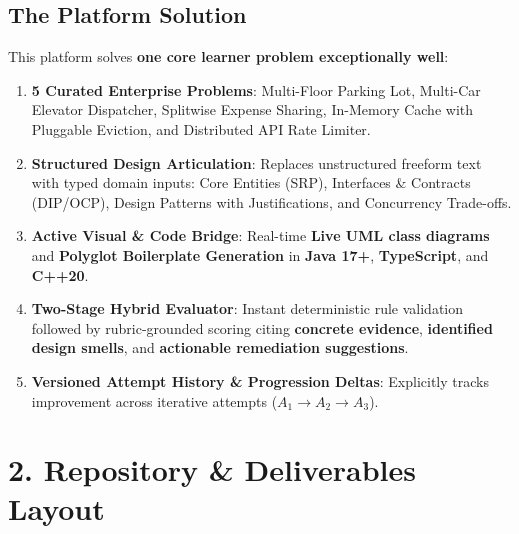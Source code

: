 \documentclass[10pt,a4paper]{article}
\begin{document}
\subsection{The Platform Solution}
This platform solves \textbf{one core learner problem exceptionally well}:
\begin{enumerate}
  \item \textbf{5 Curated Enterprise Problems}: Multi-Floor Parking Lot, Multi-Car Elevator Dispatcher, Splitwise Expense Sharing, In-Memory Cache with Pluggable Eviction, and Distributed API Rate Limiter.
  \item \textbf{Structured Design Articulation}: Replaces unstructured freeform text with typed domain inputs: Core Entities (SRP), Interfaces \& Contracts (DIP/OCP), Design Patterns with Justifications, and Concurrency Trade-offs.
  \item \textbf{Active Visual \& Code Bridge}: Real-time \textbf{Live UML class diagrams} and \textbf{Polyglot Boilerplate Generation} in \textbf{Java 17+}, \textbf{TypeScript}, and \textbf{C++20}.
  \item \textbf{Two-Stage Hybrid Evaluator}: Instant deterministic rule validation followed by rubric-grounded scoring citing \textbf{concrete evidence}, \textbf{identified design smells}, and \textbf{actionable remediation suggestions}.
  \item \textbf{Versioned Attempt History \& Progression Deltas}: Explicitly tracks improvement across iterative attempts ($A_1 \rightarrow A_2 \rightarrow A_3$).
\end{enumerate}

\section{2. Repository \& Deliverables Layout}
\end{document}
